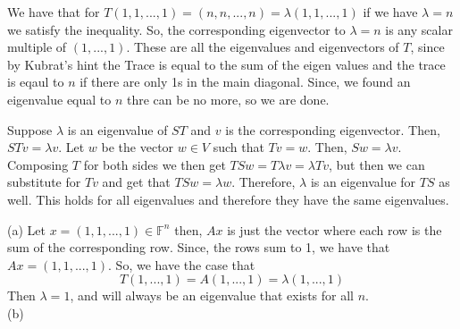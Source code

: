 \documentclass[10pt, twocolumn]{article}
\newcommand{\F}{\mathbb{F}}
\begin{document}
\begin{q}[19]
	We have that for $ T(1, 1, ..., 1) = (n, n , ..., n) = \lambda (1, 1, ..., 1) $ if we have $ \lambda = n $ we satisfy the inequality.
	So, the corresponding eigenvector to $ \lambda = n $ is any scalar multiple of $ (1, ..., 1) $. 
	These are all the eigenvalues and eigenvectors of $ T $, since by Kubrat's hint the Trace is equal to the sum of the eigen values and the trace is eqaul to $ n $ if there are only 1s in the main diagonal. 
	Since, we found an eigenvalue equal to $ n $ thre can be no more, so we are done. 
\end{q}
\begin{q}[23]
	Suppose $ \lambda $ is an eigenvalue of $ ST $ and $ v $ is the corresponding eigenvector.
	Then, $ STv = \lambda v $. 
	Let $ w $ be the vector $ w \in V $ such that $ Tv = w $. 
	Then, $ Sw = \lambda v $. 
	Composing $ T $ for both sides we then get 
	$ TSw = T \lambda v = \lambda Tv $, but then we can substitute for $ Tv $ and get that 
	$ TSw = \lambda w $. Therefore, $ \lambda $ is an eigenvalue for $ TS $ as well. 
	This holds for all eigenvalues and therefore they have the same eigenvalues. 
\end{q}
\begin{q}[24]
	(a)
	Let $ x = (1, 1, ..., 1) \in \F^n $ then, $ Ax $ is just the vector where each row is the sum of the corresponding row.
	Since, the rows sum to 1, we have that $ Ax = (1, 1, ..., 1) $. So, we have the case that 
	$$ T(1, ..., 1) = A(1, ..., 1) = \lambda (1, ..., 1) $$
	Then $ \lambda = 1 $, and will always be an eigenvalue that exists for all $ n $. \\
	(b) 
\end{q}
\end{document}
